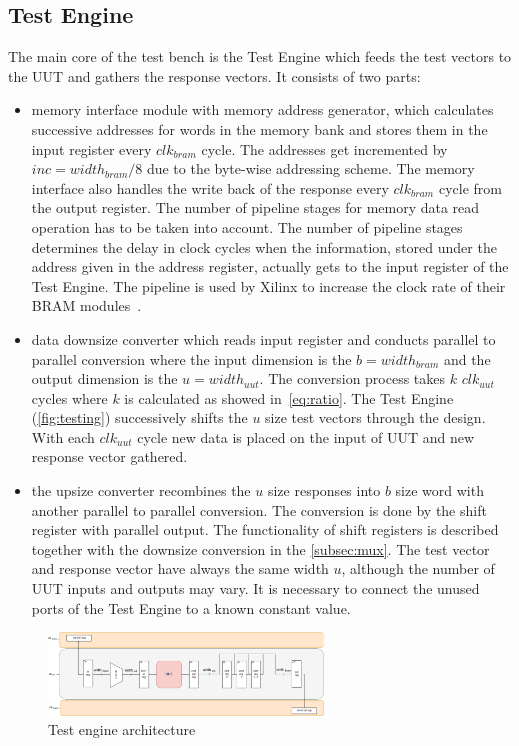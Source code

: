 \subsection{Test Engine}\label{ssec:engine}
The main core of the test bench is the Test Engine which feeds the test vectors to the UUT and gathers the response vectors. It consists of two parts:
\begin{itemize}
    \item memory interface module with memory address generator, which calculates successive addresses for words in the memory bank and stores them in the input register every $clk_{bram}$ cycle. The addresses get incremented by $inc = width_{bram}/8$ due to the byte-wise addressing scheme. The memory interface also handles the write back of the response every $clk_{bram}$ cycle from the output register. The number of pipeline stages for memory data read operation has to be taken into account. The number of pipeline stages determines the delay in clock cycles when the information, stored under the address given in the address register, actually gets to the input register of the Test Engine. The pipeline is used by Xilinx to increase the clock rate of their BRAM modules~\cite{report:BRAM}.
    \item data downsize converter which reads input register and conducts parallel to parallel conversion where the input dimension is the $b=width_{bram}$ and the output dimension is the $u=width_{uut}$. The conversion process takes $k$ $clk_{uut}$ cycles where $k$ is calculated as showed in~\autoref{eq:ratio}. The Test Engine (\autoref{fig:testing}) successively shifts the $u$ size test vectors through the design. With each $clk_{uut}$ cycle new data is placed on the input of UUT and new response vector gathered.
    \item the upsize converter recombines the $u$ size responses into $b$ size word with another parallel to parallel conversion. The conversion is done by the shift register with parallel output. The functionality of shift registers is described together with the downsize conversion in the \autoref{subsec:mux}. The test vector and response vector have always the same width $u$, although the number of UUT inputs and outputs may vary. It is necessary to connect the unused ports of the Test Engine to a known constant value.
\end{itemize}
\begin{figure}[h]
\centering
\includegraphics[width=0.65\textwidth]{figures/Test_Engine_complex.png}
\caption{Test engine architecture}
\label{fig:testing}
\end{figure}


